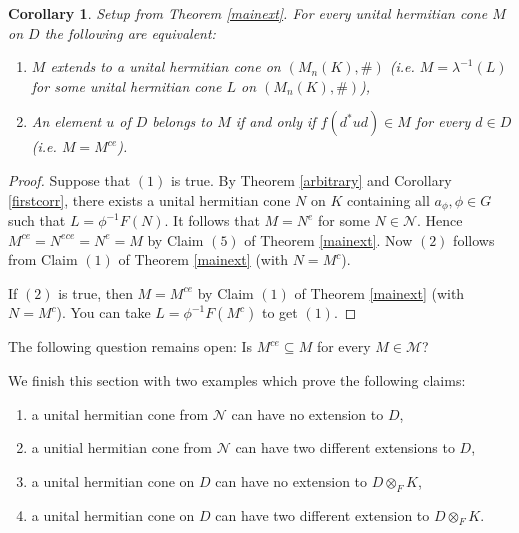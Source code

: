 \documentclass[12pt,reqno]{amsart}
\newtheorem{cor}[thm]{Corollary}
\theoremstyle{definition}
\begin{document}
\begin{cor}
Setup from Theorem \ref{mainext}. For every unital hermitian cone $M$ on $D$ the following
are equivalent:
\begin{enumerate}
\item $M$ extends to a unital hermitian cone on $(M_n(K),\#)$ (i.e. $M=\lambda^{-1}(L)$
for some unital hermitian cone $L$ on $(M_n(K),\#)$),
\item An element $u$ of $D$ belongs to $M$ if and only if $f(d^\ast u d) \in M$ for every $d \in D$
(i.e. $M=M^{ce}$).
\end{enumerate}
\end{cor}

\begin{proof}
Suppose that $(1)$ is true. By Theorem \ref{arbitrary} and Corollary \ref{firstcorr}, 
there exists a unital hermitian cone $N$ on $K$ containing all $a_\phi, \phi \in G$
such that $L=\phi^{-1}F(N)$. It follows that $M=N^e$ for some $N \in \mathcal{N}$.
Hence $M^{ce}=N^{ece}=N^e=M$ by Claim $(5)$ of Theorem \ref{mainext}.
Now $(2)$ follows from Claim $(1)$ of Theorem \ref{mainext} (with $N=M^c$).

If $(2)$ is true, then $M=M^{ce}$ by Claim $(1)$ of Theorem \ref{mainext} (with $N=M^c$).
You can take $L=\phi^{-1}F(M^c)$ to get $(1)$.
\end{proof}

The following question remains open:
Is $M^{ce} \subseteq M$ for every $M \in \mathcal{M}$?



We finish this section with two examples which prove the following claims:
\begin{enumerate}
\item a unital hermitian cone from $\mathcal{N}$ can have no extension to $D$,
\item a unitial hermitian cone from $\mathcal{N}$ can have two different extensions to $D$,
\item a unital hermitian cone on $D$ can have no extension to $D \otimes_F K$,
\item a unital hermitian cone on $D$ can have two different extension to $D \otimes_F K$.
\end{enumerate}
\end{document}
